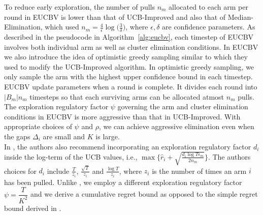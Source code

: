 To reduce early exploration, the number of pulls $n_m$ allocated to each arm per round in EUCBV is lower than that of UCB-Improved and also that of Median-Elimination, which used $n_m=\frac{4}{\epsilon}\log\big(\frac{3}{\delta}\big)$, where $\epsilon,\delta$ are confidence parameters. As described in the pseudocode in Algorithm~\ref{alg:eucbv}, each timestep of EUCBV involves both individual arm as well as cluster elimination conditions. In EUCBV we also introduce the idea of optimistic greedy sampling similar to \citet{liu2016modification} which they used to modify the UCB-Improved algorithm. In optimistic greedy sampling, we only sample the arm with the highest upper confidence bound in each timestep. EUCBV update parameters when a round is complete. It divides each round into $|B_{m}|n_{m}$ timesteps so that each surviving arms can be allocated atmost $n_{m}$ pulls. The exploration regulatory factor $\psi$ governing the arm and cluster elimination conditions in EUCBV is more aggressive than that in UCB-Improved. With appropriate choices of $\psi$ and $\rho$, we can achieve aggressive elimination even when the gaps $\Delta_i$ are small and $K$ is large. \\
In \citet{liu2016modification}, the authors also recommend incorporating an exploration regulatory factor $d_i$ inside the log-term of the UCB values, i.e., $\max \lbrace\hat{r}_{i}+\sqrt{\frac{d_{i}\log T{\epsilon}_{m}}{2n_{m}}}\rbrace$. The authors choices for $d_i$ include $\frac{T}{z_{i}}$, $\frac{\sqrt{T}}{z_{i}}$ and $\frac{\log T}{z_{i}}$, where $z_{i}$ is the number of times an arm ${i}$ has been pulled. Unlike \citet{liu2016modification}, we employ a different exploration regulatory factor $\psi=\dfrac{T}{K^2}$ and we derive a cumulative regret bound as opposed to the simple regret bound derived in \citet{liu2016modification}.

	

